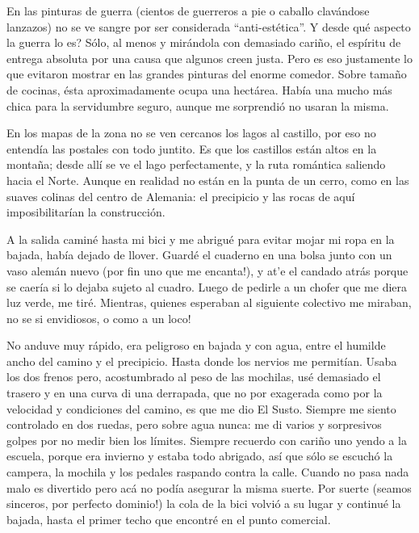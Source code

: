 En las pinturas de guerra (cientos de guerreros a pie o caballo clav\'andose
lanzazos) no se ve sangre por ser considerada ``anti-est\'etica''.
\textquestiondown Y desde qu\'e aspecto la guerra lo es? S\'olo, al menos y
mir\'andola con demasiado cari\~no, el esp\'iritu de entrega absoluta por una
causa que algunos creen justa. Pero es eso justamente lo que evitaron mostrar
en las grandes pinturas del enorme comedor. Sobre tama\~no de cocinas, \'esta
aproximadamente ocupa una hect\'area. Hab\'ia una mucho m\'as chica para la
servidumbre seguro, aunque me sorprendi\'o no usaran la misma.

En los mapas de la zona no se ven cercanos los lagos al castillo, por eso no
entend\'ia las postales con todo juntito. Es que los castillos est\'an altos
en la monta\~na; desde all\'i se ve el lago perfectamente, y la ruta
rom\'antica saliendo hacia el Norte. Aunque en realidad no est\'an en la punta
de un cerro, como en las suaves colinas del centro de Alemania: el precipicio y
las rocas de aqu\'i imposibilitar\'ian la construcci\'on.

A la salida camin\'e hasta mi bici y me abrigu\'e para evitar mojar mi ropa en
la bajada, hab\'ia dejado de llover. Guard\'e el cuaderno en una bolsa junto
con un vaso alem\'an nuevo (\textexclamdown por fin uno que me encanta!), y
at'e el candado atr\'as porque se caer\'ia si lo dejaba sujeto al cuadro.
Luego de pedirle a un chofer que me diera luz verde, me tir\'e. Mientras,
quienes esperaban al siguiente colectivo me miraban, \textexclamdown no se si
envidiosos, o como a un loco!

No anduve muy r\'apido, era peligroso en bajada y con agua, entre el humilde
ancho del camino y el precipicio. Hasta donde los nervios me permit\'ian.
Usaba los dos frenos pero, acostumbrado al peso de las mochilas, us\'e
demasiado el trasero y en una curva di una derrapada, que no por exagerada
como por la velocidad y condiciones del camino, es que me dio El Susto.
Siempre me siento controlado en dos ruedas, pero sobre agua nunca: me di
varios y sorpresivos golpes por no medir bien los l\'imites. Siempre recuerdo
con cari\~no uno yendo a la escuela, porque era invierno y estaba todo abrigado,
as\'i que s\'olo se escuch\'o la campera, la mochila y los pedales raspando
contra la calle. Cuando no pasa nada malo es divertido pero ac\'a no pod\'ia
asegurar la misma suerte. Por suerte (seamos sinceros, \textexclamdown por
perfecto dominio!) la cola de la bici volvi\'o a su lugar y continu\'e la
bajada, hasta el primer techo que encontr\'e en el punto comercial.

